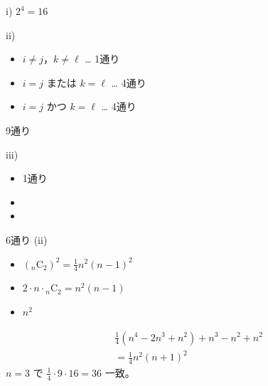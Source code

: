 i) $2^{4}=16$

ii)
\begin{itemize}[leftmargin=2em,itemsep=0pt,topsep=2pt]
\item[①] $i\neq j$，$k\neq\ell$ … 1通り
\item[②] $i=j$ または $k=\ell$ … 4通り
\item[③] $i=j$ かつ $k=\ell$ … 4通り
\end{itemize}
9通り

iii)
\begin{itemize}[leftmargin=2em,itemsep=0pt,topsep=2pt]
\item[①] 1通り
\item[②] 
\item[③] 
\end{itemize}
6通り
(ii)
\begin{itemize}[leftmargin=2em,itemsep=0pt,topsep=2pt]
\item[①] $({}_{n}\mathrm{C}_{2})^{2}=\frac{1}{4}n^{2}(n-1)^{2}$
\item[②] $2\cdot n\cdot{}_{n}\mathrm{C}_{2}=n^{2}(n-1)$
\item[③] $n^{2}$
\end{itemize}
\begin{align*}
&\frac{1}{4}(n^{4}-2n^{3}+n^{2})+n^{3}-n^{2}+n^{2}\\
&=\frac{1}{4}n^{2}(n+1)^{2}
\end{align*}
$n=3$ で $\frac{1}{4}\cdot9\cdot16=36$ 一致。

